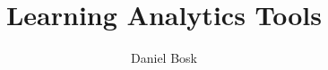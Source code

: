 \documentclass[a4paper,oneside]{book}
\title{%
  Learning Analytics Tools
}
\author{Daniel Bosk}
\institute{%
  KTH EECS
}
\newenvironment{abstract}{}{}
\begin{document}
\thispagestyle{empty}
\maketitle

\frontmatter
\begin{abstract}
  
\end{abstract}

\tableofcontents

\mainmatter


\backmatter
\printbibliography
\end{document}
